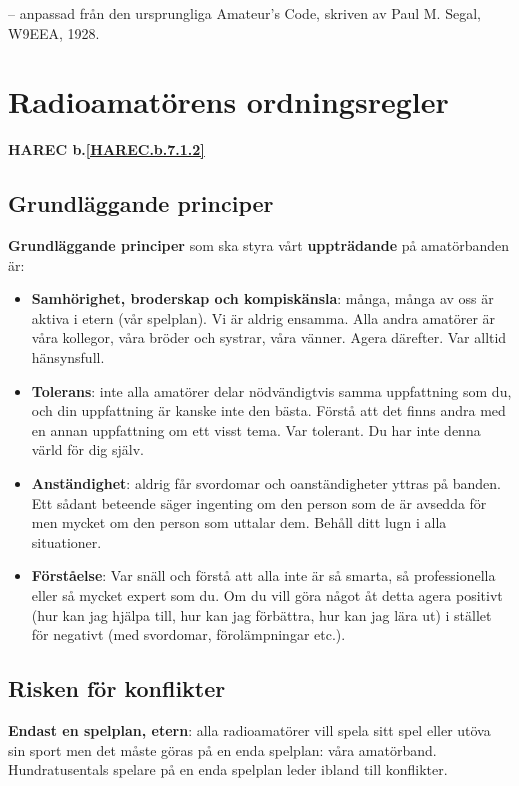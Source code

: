 -- anpassad från den ursprungliga Amateur's Code, skriven av Paul M. Segal, W9EEA, 1928.

\section[Ordningsregler]{Radioamatörens ordningsregler}
\textbf{HAREC
  b.\ref{HAREC.b.7.1.2}\label{myHAREC.b.7.1.2}
}

\subsection{Grundläggande principer}
\textbf{Grundläggande principer} som ska styra vårt \textbf{uppträdande} på
amatörbanden är:

\begin{itemize}
\item \textbf{Samhörighet, broderskap och kompiskänsla}: många, många av oss
  är aktiva i etern (vår spelplan).
  Vi är aldrig ensamma.
  Alla andra amatörer är våra kollegor, våra bröder och systrar, våra vänner.
  Agera därefter.
  Var alltid hänsynsfull.

\item \textbf{Tolerans}: inte alla amatörer delar nödvändigtvis samma
  uppfattning som du, och din uppfattning är kanske inte den bästa.
  Förstå att det finns andra med en annan uppfattning om ett visst tema.
  Var tolerant.
  Du har inte denna värld för dig själv.

\item \textbf{Anständighet}: aldrig får svordomar och oanständigheter yttras
  på banden.
  Ett sådant beteende säger ingenting om den person som de är avsedda för men
  mycket om den person som uttalar dem.
  Behåll ditt lugn i alla situationer.

\item \textbf{Förståelse}: Var snäll och förstå att alla inte är så smarta,
  så professionella eller så mycket expert som du.
  Om du vill göra något åt detta agera positivt (hur kan jag hjälpa till,
  hur kan jag förbättra, hur kan jag lära ut) i stället för negativt
  (med svordomar, förolämpningar etc.).
\end{itemize}

\subsection{Risken för konflikter}
\textbf{Endast en spelplan, etern}: alla radioamatörer vill spela sitt spel
eller utöva sin sport men det måste göras på en enda spelplan: våra amatörband.
Hundratusentals spelare på en enda spelplan leder ibland till konflikter.

